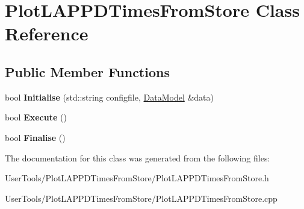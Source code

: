 \hypertarget{classPlotLAPPDTimesFromStore}{
\section{PlotLAPPDTimesFromStore Class Reference}
\label{classPlotLAPPDTimesFromStore}
}
\subsection*{Public Member Functions}
\begin{DoxyCompactItemize}
\item 
\hypertarget{classPlotLAPPDTimesFromStore_a1c22a1c4414885d84bbc496082fc04d3}{
bool {\bfseries Initialise} (std::string configfile, \hyperlink{classDataModel}{DataModel} \&data)}
\label{classPlotLAPPDTimesFromStore_a1c22a1c4414885d84bbc496082fc04d3}

\item 
\hypertarget{classPlotLAPPDTimesFromStore_a785fe9ebe3ffe9c8d889eb25323b8ea4}{
bool {\bfseries Execute} ()}
\label{classPlotLAPPDTimesFromStore_a785fe9ebe3ffe9c8d889eb25323b8ea4}

\item 
\hypertarget{classPlotLAPPDTimesFromStore_a38ddf79485e6f76cf142c90243dcd119}{
bool {\bfseries Finalise} ()}
\label{classPlotLAPPDTimesFromStore_a38ddf79485e6f76cf142c90243dcd119}

\end{DoxyCompactItemize}


The documentation for this class was generated from the following files:\begin{DoxyCompactItemize}
\item 
UserTools/PlotLAPPDTimesFromStore/PlotLAPPDTimesFromStore.h\item 
UserTools/PlotLAPPDTimesFromStore/PlotLAPPDTimesFromStore.cpp\end{DoxyCompactItemize}
